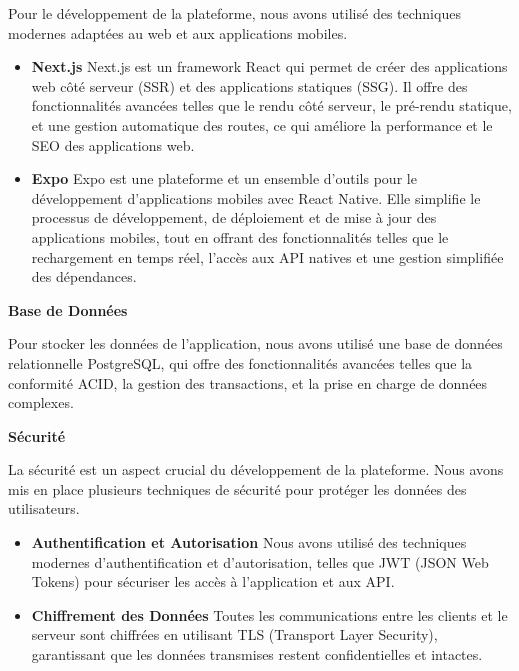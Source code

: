     Pour le développement de la plateforme, nous avons utilisé des techniques
    modernes adaptées au web et aux applications mobiles.
    \begin {itemize}
  \item \textbf{{Next.js}}
    Next.js est un framework React qui permet de créer des applications web côté
    serveur (SSR) et des applications statiques (SSG). Il offre des fonctionnalités
    avancées telles que le rendu côté serveur, le pré-rendu statique, et une
    gestion automatique des routes, ce qui améliore la performance et le
    SEO des applications web.

  \item \textbf{{Expo}}
    Expo est une plateforme et un ensemble d'outils pour le développement
    d'applications mobiles avec React Native. Elle simplifie le processus de
    développement, de déploiement et de mise à jour des applications mobiles,
    tout en offrant des fonctionnalités telles que le rechargement en temps réel,
    l'accès aux API natives et une gestion simplifiée des dépendances.

\end{itemize}

\textbf{{Base de Données}}

  Pour stocker les données de l'application, nous avons utilisé une base de
  données relationnelle PostgreSQL, qui offre des fonctionnalités avancées
  telles que la conformité ACID, la gestion des transactions, et la prise en
  charge de données complexes.

\textbf{{Sécurité}}

  La sécurité est un aspect crucial du développement de la plateforme. Nous
  avons mis en place plusieurs techniques de sécurité pour protéger les données
  des utilisateurs.
  \begin{itemize}
    \item \textbf{{Authentification et Autorisation}}
      Nous avons utilisé des techniques modernes d'authentification et
      d'autorisation, telles que JWT (JSON Web Tokens) pour sécuriser les accès
      à l'application et aux API.

    \item \textbf{{Chiffrement des Données}}
      Toutes les communications entre les clients et le serveur sont chiffrées
      en utilisant TLS (Transport Layer Security), garantissant que les données
      transmises restent confidentielles et intactes.
  \end{itemize}

